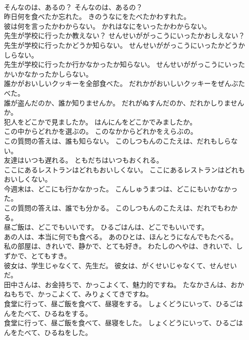 \documentclass[8pt]{extreport}
\begin{document}
\begin{CJK}{UTF8}{min}
\\	そんなのは、あるの？	そんなのは、あるの？ 
\\	昨日何を食べたか忘れた。	きのうなにをたべたかわすれた。 
\\	彼は何を言ったかわからない。	かれはなにをいったかわからない。 
\\	先生が学校に行ったか教えない？	せんせいががっこうにいったかおしえない？ 
\\	先生が学校に行ったかどうか知らない。	せんせいががっこうにいったかどうかしらない。 
\\	先生が学校に行ったか行かなかったか知らない。	せんせいががっこうにいったかいかなかったかしらない。 
\\	誰かがおいしいクッキーを全部食べた。	だれかがおいしいクッキーをぜんぶたべた。 
\\	誰が盗んだのか、誰か知りませんか。	だれがぬすんだのか、だれかしりませんか。 
\\	犯人をどこかで見ましたか。	はんにんをどこかでみましたか。 
\\	この中からどれかを選ぶの。	このなかからどれかをえらぶの。 
\\	この質問の答えは、誰も知らない。	このしつもんのこたえは、だれもしらない。 
\\	友達はいつも遅れる。	ともだちはいつもおくれる。 
\\	ここにあるレストランはどれもおいしくない。	ここにあるレストランはどれもおいしくない。 
\\	今週末は、どこにも行かなかった。	こんしゅうまつは、どこにもいかなかった。 
\\	この質問の答えは、誰でも分かる。	このしつもんのこたえは、だれでもわかる。 
\\	昼ご飯は、どこでもいいです。	ひるごはんは、どこでもいいです。 
\\	あの人は、本当に何でも食べる。	あのひとは、ほんとうになんでもたべる。 
\\	私の部屋は、きれいで、静かで、とても好き。	わたしのへやは、きれいで、しずかで、とてもすき。 
\\	彼女は、学生じゃなくて、先生だ。	彼女は、がくせいじゃなくて、せんせいだ。 
\\	田中さんは、お金持ちで、かっこよくて、魅力的ですね。	たなかさんは、おかねもちで、かっこよくて、みりょくてきですね。 
\\	食堂に行って、昼ご飯を食べて、昼寝をする。	しょくどうにいって、ひるごはんをたべて、ひるねをする。 
\\	食堂に行って、昼ご飯を食べて、昼寝をした。	しょくどうにいって、ひるごはんをたべて、ひるねをした。 

\end{CJK}
\end{document}
